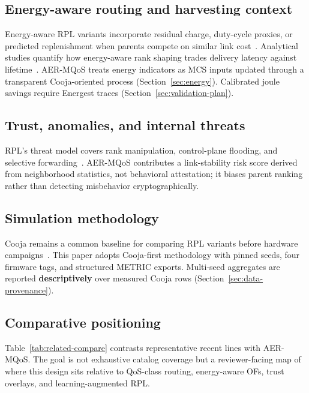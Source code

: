 \subsection{Energy-aware routing and harvesting context}
Energy-aware RPL variants incorporate residual charge, duty-cycle proxies, or predicted replenishment when parents compete on similar link cost~\cite{lamaazi2018energyrpl,ghosh2023cbedrpl,abujassar2024multipathrpl}. Analytical studies quantify how energy-aware rank shaping trades delivery latency against lifetime~\cite{limjoco2018analytical}. AER-MQoS treats energy indicators as MCS inputs updated through a transparent Cooja-oriented process (Section~\ref{sec:energy}). Calibrated joule savings require Energest traces (Section~\ref{sec:validation-plan}).

\subsection{Trust, anomalies, and internal threats}
RPL's threat model covers rank manipulation, control-plane flooding, and selective forwarding~\cite{rfc7416,alamiedy2023rplattacks}. AER-MQoS contributes a link-stability risk score derived from neighborhood statistics, not behavioral attestation; it biases parent ranking rather than detecting misbehavior cryptographically.

\subsection{Simulation methodology}
Cooja remains a common baseline for comparing RPL variants before hardware campaigns~\cite{osterlind2006cooja,rfc6687}. This paper adopts Cooja-first methodology with pinned seeds, four firmware tags, and structured METRIC exports. Multi-seed aggregates are reported \textbf{descriptively} over measured Cooja rows (Section~\ref{sec:data-provenance}).

\subsection{Comparative positioning}
Table~\ref{tab:related-compare} contrasts representative recent lines with AER-MQoS. The goal is not exhaustive catalog coverage but a reviewer-facing map of where this design sits relative to QoS-class routing, energy-aware OFs, trust overlays, and learning-augmented RPL.

